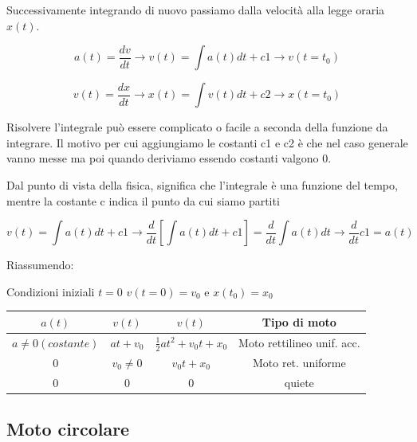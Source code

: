 Successivamente integrando di nuovo passiamo dalla velocità alla 
legge oraria $x(t)$.

\begin{equation}
    a(t)=\frac{dv}{dt} \rightarrow v(t)= \int {a(t) dt} +c1 \rightarrow v(t=t_0)
\end{equation}

\begin{equation}
    v(t)=\frac{dx}{dt} \rightarrow x(t)= \int {v(t)dt} +c2 \rightarrow x(t=t_0)
\end{equation}


 Risolvere l'integrale può essere complicato o facile a seconda della funzione
 da integrare.
Il motivo per cui aggiungiamo le costanti c1 e c2 è
che nel caso generale vanno messe ma poi quando deriviamo 
essendo costanti valgono $0$.

Dal punto di vista della fisica, significa che l'integrale è una
funzione del tempo, mentre la costante c indica il punto da cui siamo
partiti

\begin{equation}
   v(t)= \int {a(t)dt} +c1 \rightarrow 
   \frac{d}{dt}[\int{a(t)dt}+c1]=
   \frac{d}{dt}\int{a(t)dt}\rightarrow \frac{d}{dt}c1=a(t)
\end{equation}

Riassumendo:

Condizioni iniziali $t=0$
$v(t=0)=v_0$ e $x(t_0)=x_0$

\begin{center}
    \begin{tabular}{ |c|c|c|c| } 
     \hline
     $a(t)$ & $v(t)$ & $v(t)$ & Tipo di moto \\ 
     \hline
        $a\neq 0 (costante)$ & $at+v_0$ & $\frac{1}{2}at^2+v_0t+x_0$ & Moto rettilineo unif. acc. \\ 
     $0$ & $v_0 \neq 0$ & $v_0t+x_0$ & Moto ret. uniforme \\ 
     $0$ & $0$ & $0$ & quiete \\
     \hline
    \end{tabular}
\end{center}

\subsection{Moto circolare} %